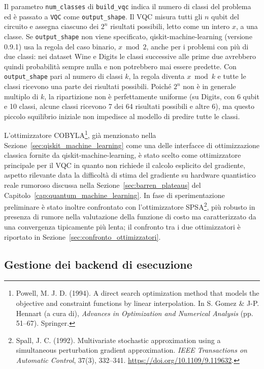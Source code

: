 Il parametro \texttt{num\_classes} di \texttt{build\_vqc} indica il numero di classi del problema ed è passato a \texttt{VQC} come \texttt{output\_shape}. Il VQC misura tutti gli $n$ qubit del circuito e assegna ciascuno dei $2^n$ risultati possibili, letto come un intero $x$, a una classe. Se \texttt{output\_shape} non viene specificato, qiskit-machine-learning (versione 0.9.1) usa la regola del caso binario, $x \bmod 2$, anche per i problemi con più di due classi: nei dataset Wine e Digits le classi successive alle prime due avrebbero quindi probabilità sempre nulla e non potrebbero mai essere predette. Con \texttt{output\_shape} pari al numero di classi $k$, la regola diventa $x \bmod k$ e tutte le classi ricevono una parte dei risultati possibili. Poiché $2^n$ non è in generale multiplo di $k$, la ripartizione non è perfettamente uniforme (su Digits, con 6 qubit e 10 classi, alcune classi ricevono 7 dei 64 risultati possibili e altre 6), ma questo piccolo squilibrio iniziale non impedisce al modello di predire tutte le classi.

L'ottimizzatore COBYLA\footnote{Powell, M. J. D. (1994). A direct search optimization method that models the objective and constraint functions by linear interpolation. In S. Gomez \& J-P. Hennart (a cura di), \textit{Advances in Optimization and Numerical Analysis} (pp. 51--67). Springer.}, già menzionato nella Sezione~\ref{sec:qiskit_machine_learning} come una delle interfacce di ottimizzazione classica fornite da qiskit-machine-learning, è stato scelto come ottimizzatore principale per il VQC in quanto non richiede il calcolo esplicito del gradiente, aspetto rilevante data la difficoltà di stima del gradiente su hardware quantistico reale rumoroso discussa nella Sezione~\ref{sec:barren_plateaus} del Capitolo~\ref{cap:quantum_machine_learning}. In fase di sperimentazione preliminare è stato inoltre confrontato con l'ottimizzatore SPSA\footnote{Spall, J. C. (1992). Multivariate stochastic approximation using a simultaneous perturbation gradient approximation. \textit{IEEE Transactions on Automatic Control}, 37(3), 332--341. \url{https://doi.org/10.1109/9.119632}.}, più robusto in presenza di rumore nella valutazione della funzione di costo ma caratterizzato da una convergenza tipicamente più lenta; il confronto tra i due ottimizzatori è riportato in Sezione~\ref{sec:confronto_ottimizzatori}.

\subsection{Gestione dei backend di esecuzione}
\label{sec:impl_backend}

